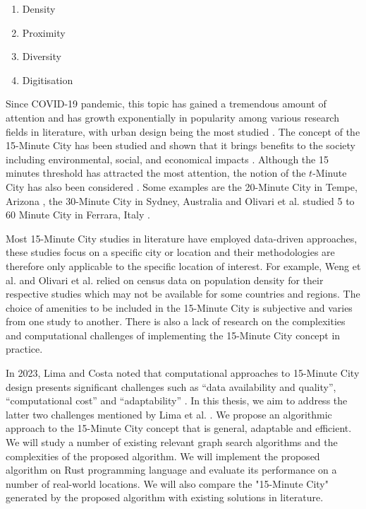 \begin{multicols}{2}
    \begin{enumerate}
        \item Density
        \item Proximity
        \item Diversity
        \item Digitisation
    \end{enumerate}
\end{multicols}
Since COVID-19 pandemic, this topic has gained a tremendous amount of attention and has growth exponentially in popularity \cite{lima_quest_2023,allam_theoretical_2022} among various research fields in literature, with urban design being the most studied \cite{lima_quest_2023}. The concept of the 15-Minute City has been studied and shown that it brings benefits to the society including environmental, social, and economical impacts \cite{allam_theoretical_2022}. Although the 15 minutes threshold has attracted the most attention, the notion of the $t$-Minute City has also been considered \cite{moreno_introducing_2021}. Some examples are the 20-Minute City in Tempe, Arizona \cite{capasso_da_silva_accessibility_2019}, the 30-Minute City in Sydney, Australia \cite{sarkar_measuring_2020} and Olivari et al. studied 5 to 60 Minute City in Ferrara, Italy \cite{olivari_are_2023}. 

Most 15-Minute City studies in literature have employed data-driven approaches, these studies focus on a specific city or location and their methodologies are therefore only applicable to the specific location of interest. For example, Weng et al. \cite{weng_15-minute_2019} and Olivari et al.\cite{olivari_are_2023} relied on census data on population density for their respective studies which may not be available for some countries and regions. The choice of amenities to be included in the 15-Minute City is subjective and varies from one study to another. There is also a lack of research on the complexities and computational challenges of implementing the 15-Minute City concept in practice.

In 2023, Lima and Costa noted that computational approaches to 15-Minute City design presents significant challenges such as “data availability and quality”, “computational cost” and “adaptability” \cite{lima_quest_2023}. In this thesis, we aim to address the latter two challenges mentioned by Lima et al. \cite{lima_quest_2023}. We propose an algorithmic approach to the 15-Minute City concept that is general, adaptable and efficient. We will study a number of existing relevant graph search algorithms and the complexities of the proposed algorithm. We will implement the proposed algorithm on Rust programming language and evaluate its performance on a number of real-world locations. We will also compare the "15-Minute City" generated by the proposed algorithm with existing solutions in literature.